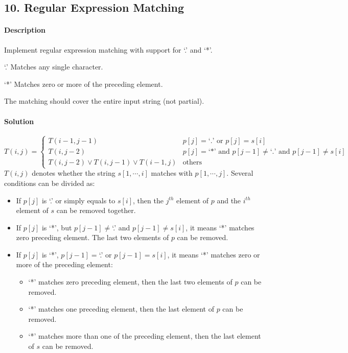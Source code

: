 \subsection{10. Regular Expression Matching}

\paragraph{Description}

Implement regular expression matching with support for `.' and `*'.

`.' Matches any single character.

`*' Matches zero or more of the preceding element.

The matching should cover the entire input string (not partial).

\paragraph{Solution}

\begin{equation*}
T(i,j)=\begin{cases}
T(i-1,j-1) & p[j]=\text{`.' or }p[j]=s[i]\\
T(i,j-2) & p[j]=\text{`*' and }p[j-1]\neq\text{`.' and }p[j-1]\neq s[i]\\
T(i,j-2)\vee T(i,j-1)\vee T(i-1,j) & \text{others}
\end{cases}
\end{equation*}
$T(i,j)$ denotes whether the string $s[1,\cdots,i]$ matches with $p[1,\cdots,j]$. Several conditions can be divided as:
\begin{itemize}
    \item If $p[j]$ is `.' or simply equals to $s[i]$, then the $j^{th}$ element of $p$ and the $i^{th}$ element of $s$ can be removed together.
    \item If $p[j]$ is `*', but $p[j-1]\neq$`.' and $p[j-1]\neq s[i]$, it means `*' matches zero preceding element. The last two elements of $p$ can be removed.
    \item If $p[j]$ is `*', $p[j-1]=$`.' or $p[j-1]=s[i]$, it means `*' matches zero or more of the preceding element:
    \begin{itemize}
        \item `*' matches zero preceding element, then the last two elements of $p$ can be removed.
        \item `*' matches one preceding element, then the last element of $p$ can be removed.
        \item `*' matches more than one of the preceding element, then the last element of $s$ can be removed.
    \end{itemize}
\end{itemize}


